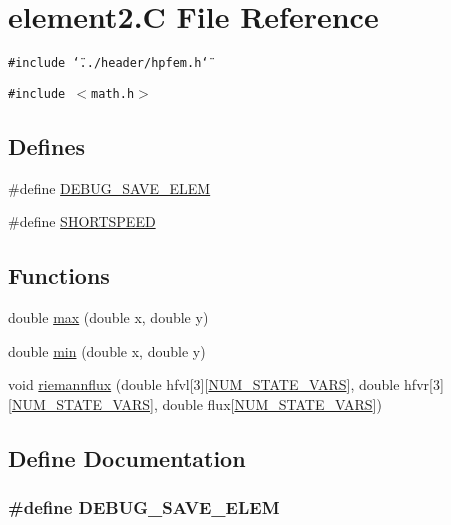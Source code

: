 \hypertarget{datstr_2element2_8C}{
\section{element2.C File Reference}
\label{datstr_2element2_8C}
}
{\tt \#include \char`\"{}../header/hpfem.h\char`\"{}}\par
{\tt \#include $<$math.h$>$}\par
\subsection*{Defines}
\begin{CompactItemize}
\item 
\#define \hyperlink{datstr_2element2_8C_a0}{DEBUG\_\-SAVE\_\-ELEM}
\item 
\#define \hyperlink{datstr_2element2_8C_a1}{SHORTSPEED}
\end{CompactItemize}
\subsection*{Functions}
\begin{CompactItemize}
\item 
double \hyperlink{datstr_2element2_8C_a2}{max} (double x, double y)
\item 
double \hyperlink{datstr_2element2_8C_a3}{min} (double x, double y)
\item 
void \hyperlink{datstr_2element2_8C_a4}{riemannflux} (double hfvl\mbox{[}3\mbox{]}\mbox{[}\hyperlink{constant_8h_a35}{NUM\_\-STATE\_\-VARS}\mbox{]}, double hfvr\mbox{[}3\mbox{]}\mbox{[}\hyperlink{constant_8h_a35}{NUM\_\-STATE\_\-VARS}\mbox{]}, double flux\mbox{[}\hyperlink{constant_8h_a35}{NUM\_\-STATE\_\-VARS}\mbox{]})
\end{CompactItemize}


\subsection{Define Documentation}
\hypertarget{datstr_2element2_8C_a0}{
\subsubsection[DEBUG\_\-SAVE\_\-ELEM]{\setlength{\rightskip}{0pt plus 5cm}\#define DEBUG\_\-SAVE\_\-ELEM}}
\label{datstr_2element2_8C_a0}


